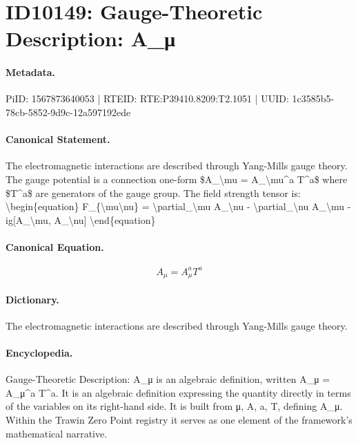 \section*{ID10149: Gauge-Theoretic Description: A\_μ}
\paragraph{Metadata.}
PiID: 1567873640053 | RTEID: RTE:P39410.8209:T2.1051 | UUID: 1c3585b5-78cb-5852-9d9c-12a597192ede

\paragraph{Canonical Statement.}
The electromagnetic interactions are described through Yang-Mills gauge theory. The gauge potential is a connection one-form \$A\_\textbackslash{}mu = A\_\textbackslash{}mu\textasciicircum{}a T\textasciicircum{}a\$ where \$T\textasciicircum{}a\$ are generators of the gauge group. The field strength tensor is: \textbackslash{}begin\{equation\} F\_\{\textbackslash{}mu\textbackslash{}nu\} = \textbackslash{}partial\_\textbackslash{}mu A\_\textbackslash{}nu - \textbackslash{}partial\_\textbackslash{}nu A\_\textbackslash{}mu - ig[A\_\textbackslash{}mu, A\_\textbackslash{}nu] \textbackslash{}end\{equation\}

\paragraph{Canonical Equation.}
\[
A_\mu = A_\mu^a T^a
\]

\paragraph{Dictionary.}
The electromagnetic interactions are described through Yang-Mills gauge theory.

\paragraph{Encyclopedia.}
Gauge-Theoretic Description: A\_μ is an algebraic definition, written A\_μ = A\_μ\textasciicircum{}a T\textasciicircum{}a. It is an algebraic definition expressing the quantity directly in terms of the variables on its right-hand side. It is built from μ, A, a, T, defining A\_μ. Within the Trawin Zero Point registry it serves as one element of the framework's mathematical narrative.
